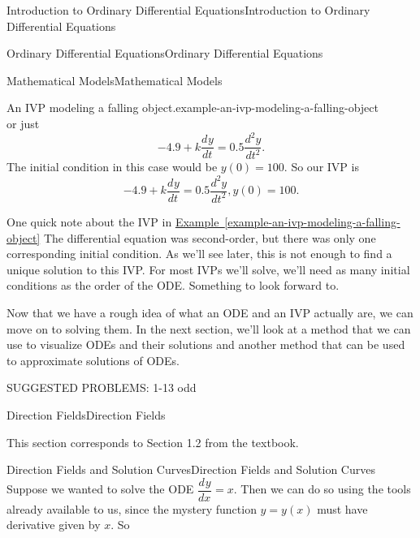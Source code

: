 \documentclass[10pt,]{book}
\numberwithin{equation}{section}
\newcommand{\dv}[3][]{\dfrac{d^{#1} #2}{d #3^{#1}}}
\begin{document}
\begin{chapterptx}{Introduction to Ordinary Differential Equations}{}{Introduction to Ordinary Differential Equations}{}{}
\begin{sectionptx}{Ordinary Differential Equations}{}{Ordinary Differential Equations}{}{}
\begin{subsectionptx}{Mathematical Models}{}{Mathematical Models}{}{}
\begin{example}{An IVP modeling a falling object.}{example-an-ivp-modeling-a-falling-object}
\begin{equation*}
\end{equation*}
or just%
\begin{equation*}
-4.9+k\dv{y}{t} = 0.5\dv[2]{y}{t}.
\end{equation*}
The initial condition in this case would be \(y(0) = 100\). So our IVP is%
\begin{equation*}
-4.9+k\dv{y}{t} = 0.5\dv[2]{y}{t}, y(0) = 100.
\end{equation*}
%
\end{example}
\hypertarget{p-33}{}%
One quick note about the IVP in \hyperref[example-an-ivp-modeling-a-falling-object]{Example~\ref{example-an-ivp-modeling-a-falling-object}} The differential equation was second-order, but there was only one corresponding initial condition. As we'll see later, this is not enough to find a unique solution to this IVP. For most IVPs we'll solve, we'll need as many initial conditions as the order of the ODE. Something to look forward to.%
\end{subsectionptx}
\begin{conclusion}{}%
\hypertarget{p-34}{}%
Now that we have a rough idea of what an ODE and an IVP actually are, we can move on to solving them. In the next section, we'll look at a method that we can use to visualize ODEs and their solutions and another method that can be used to approximate solutions of ODEs.%
\par
\hypertarget{p-35}{}%
SUGGESTED PROBLEMS: 1-13 odd%
\end{conclusion}%
\end{sectionptx}
%
%
\typeout{************************************************}
\typeout{************************************************}
%
\begin{sectionptx}{Direction Fields}{}{Direction Fields}{}{}\label{section-direction-fields}
\begin{introduction}{}%
\hypertarget{p-36}{}%
This section corresponds to Section 1.2 from the textbook.%
\end{introduction}%
%
%
\typeout{************************************************}
\typeout{************************************************}
%
\begin{subsectionptx}{Direction Fields and Solution Curves}{}{Direction Fields and Solution Curves}{}{}\label{subsection-direction-fields-and-solution-curves}
\hypertarget{p-37}{}%
Suppose we wanted to solve the ODE \(\dv{y}{x} = x\). Then we can do so using the tools already available to us, since the mystery function \(y=y(x)\) must have derivative given by \(x\). So%

\end{subsectionptx}
\end{sectionptx}
\end{chapterptx}
\end{document}
